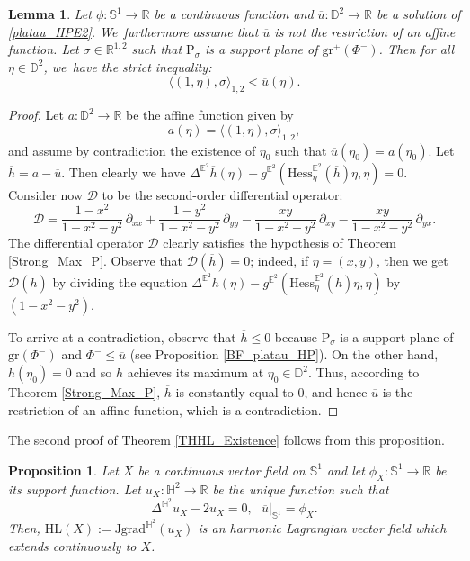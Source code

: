 \documentclass[10pt]{amsart}
\theoremstyle{plain}
\newtheorem{prop}[cor]{Proposition}
\newtheorem{lemma}[cor]{Lemma}
\theoremstyle{definition}
\newcommand{\minko}{\mathbb{R}^{1,2}}
\newcommand{\grad}{\mathrm{grad}^{\mathbb{H}^2}}
\newcommand{\J}{\mathrm{J}}
\begin{document}
\begin{lemma}\label{mean_up_convex_core}
Let $\phi: \mathbb{S}^1 \to \mathbb{R}$ be a continuous function and $\overline{u}: \mathbb{D}^2 \to \mathbb{R}$ be a solution of \eqref{platau_HPE2}. We~furthermore assume that $\overline{u}$ is not the restriction of an affine function. Let $\sigma \in \minko$ such that $\mathrm{P}_{\sigma}$ is a support plane of $\mathrm{gr}^+(\Phi^-)$. Then for all $\eta \in \mathbb{D}^2$, we~have the strict inequality:
\[
\langle (1,\eta), \sigma \rangle_{1,2} < \overline{u}(\eta).
\]
\end{lemma}

\begin{proof}
Let $a: \mathbb{D}^2 \to \mathbb{R}$ be the affine function given by
\[
a(\eta) = \langle (1,\eta), \sigma \rangle_{1,2},
\]
and assume by contradiction the existence of $\eta_0$ such that $\overline{u}(\eta_0) = a(\eta_0)$. Let $\overline{h} = a - \overline{u}$. Then clearly we have $\Delta^{\mathbb{E}^2}\overline{h}(\eta) - g^{\mathbb{E}^2}(\mathrm{Hess}^{\mathbb{E}^2}_\eta(\overline{h})\eta, \eta) = 0$.\\
Consider now $\mathcal{D}$ to be the second-order differential operator:
\begin{equation}\label{strictelliptic}
\mathcal{D} = \frac{1-x^2}{1-x^2-y^2}\,\partial_{xx} + \frac{1-y^2}{1-x^2-y^2}\,\partial_{yy} - \frac{xy}{1-x^2-y^2}\,\partial_{xy} - \frac{xy}{1-x^2-y^2}\,\partial_{yx}.
\end{equation}
The differential operator $\mathcal{D}$ clearly satisfies the hypothesis of Theorem \ref{Strong_Max_P}. Observe that $\mathcal{D}(\overline{h}) = 0$; indeed, if $\eta = (x,y)$, then we get $\mathcal{D}(\overline{h})$ by dividing the equation $\Delta^{\mathbb{E}^2}\overline{h}(\eta) - g^{\mathbb{E}^2}(\mathrm{Hess}^{\mathbb{E}^2}_\eta(\overline{h})\eta, \eta)$ by $(1-x^2-y^2)$.

To arrive at a contradiction, observe that $\overline{h} \leq 0$ because $\mathrm{P}_{\sigma}$ is a support plane of $\mathrm{gr}(\Phi^-)$ and $\Phi^- \leq \overline{u}$ (see Proposition \ref{BF_platau_HP}). On the other hand, $\overline{h}(\eta_0) = 0$ and so $\overline{h}$ achieves its maximum at $\eta_0 \in \mathbb{D}^2$. Thus, according to Theorem \ref{Strong_Max_P}, $\overline{h}$ is constantly equal to $0$, and hence $\overline{u}$ is the restriction of an affine function, which is a contradiction.
\end{proof}
The second proof of Theorem \ref{THHL_Existence} follows from this proposition.
\begin{prop}\label{second_proof}
Let $X$ be a continuous vector field on $\mathbb{S}^1$ and let $\phi_X:\mathbb{S}^1\to\mathbb{R}$ be its support function. Let $u_X:\mathbb{H}^2\to\mathbb{R}$ be the unique function such that \begin{equation}\label{platau_HP_proof}
\Delta^{\mathbb{H}^2} u_X-2u_X=0 ,\ \ \ \overline{u}|_{\mathbb{S}^1}=\phi_X.
\end{equation}
Then, $\mathrm{HL}(X):=\J\grad(u_X)$ is an harmonic Lagrangian vector field which extends continuously to $X$.
\end{prop}
\end{document}
